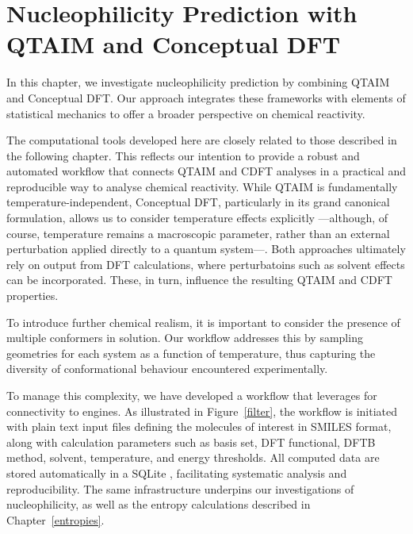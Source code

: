 \chapter{Nucleophilicity Prediction with QTAIM and Conceptual DFT}

In this chapter, we investigate nucleophilicity prediction by combining
\gls{QTAIM} and Conceptual DFT. Our approach integrates these frameworks with
elements of statistical mechanics to offer a broader perspective on chemical
reactivity.

The computational tools developed here are closely related to those described
in the following chapter. This reflects our intention to provide a robust and
automated workflow that connects \gls{QTAIM} and \gls{CDFT} analyses in a
practical and reproducible way to analyse chemical reactivity. While
\gls{QTAIM} is fundamentally temperature-independent, Conceptual DFT,
particularly in its grand canonical formulation, allows us to consider
temperature effects explicitly ---although, of course, temperature remains a
macroscopic parameter, rather than an external perturbation applied directly to
a quantum system---. Both approaches ultimately rely on output from \gls{DFT}
calculations, where perturbatoins such as solvent effects can be incorporated.
These, in turn, influence the resulting \gls{QTAIM} and \gls{CDFT} properties.

To introduce further chemical realism, it is important to consider the presence
of multiple conformers in solution. Our workflow addresses this by sampling
geometries for each system as a function of temperature, thus capturing the
diversity of conformational behaviour encountered experimentally.

\newpage
To manage this complexity, we have developed a \python workflow that leverages
\plams for connectivity to \ams engines. As illustrated in
Figure~\ref{filter}, the workflow is initiated with plain text input files
defining the molecules of interest in SMILES format, along with calculation
parameters such as basis set, DFT functional, DFTB method, solvent,
temperature, and energy thresholds. All computed data are stored automatically
in a SQLite \database, facilitating systematic analysis and reproducibility. The
same infrastructure underpins our investigations of nucleophilicity, as well as
the entropy calculations described in Chapter~\ref{entropies}.

